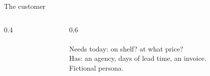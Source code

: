 \begin{frame}{The customer}
  \begin{columns}[T]
    \begin{column}{0.4\textwidth}\centering
    \end{column}
    \begin{column}{0.6\textwidth}
      {\Large\bfseries \PersonaName}\\[0.3em]
      \PersonaRole\\[1em]
      \alert{Needs today:} on shelf? at what price?\\[0.4em]
      \alert{Has:} an agency, days of lead time, an invoice.\\[0.8em]{\scriptsize Fictional persona.}
    \end{column}
  \end{columns}
\end{frame}
